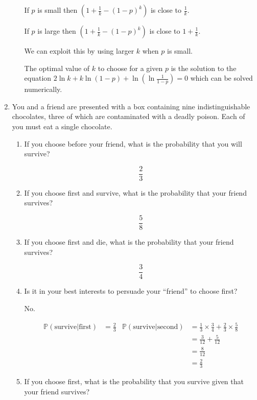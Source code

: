 \documentclass[10pt,\jkfside,a4paper]{article}
\begin{document}
\begin{enumerate}
\begin{enumerate}
If $p$ is small then $(1 + \frac{1}{k} - (1 - p)^k)$ is close to $\frac{1}{k}$.

If $p$ is large then $(1 + \frac{1}{k} - (1 - p)^k)$ is close to $1 + \frac{1}{k}$.

We can exploit this by using larger $k$ when $p$ is small.

The optimal value of $k$ to choose for a given $p$ is the solution to the equation
$2 \ln k + k\ln(1 - p) + \ln\left(\ln \frac{1}{1 - p}\right) = 0$ which can be solved
numerically.

\end{enumerate}

\item 

You and a friend are presented with a box containing nine
indistinguishable chocolates, three of which are contaminated with a deadly poison.
Each of you must eat a single chocolate.

\begin{enumerate}

\item
If you choose before your friend, what is the probability that you will survive?

\[
\frac{2}{3}
\]

\item 
If you choose first and survive, what is the probability that your friend survives?

\[
\frac{5}{8}
\]

\item 
If you choose first and die, what is the probability that your friend survives?

\[
\frac{3}{4}
\]

\item Is it in your best interests to persuade your ``friend'' to choose first?

No.

\begin{align*}
\mathbb{P}(\text{survive}|\text{first}) &= \frac{2}{3} & \mathbb{P}(\text{survive}|\text{second}) &=
\frac{1}{3}\times \frac{3}{4} + \frac{2}{3} \times \frac{5}{8} \\
& & &= \frac{3}{12} + \frac{5}{12} \\
& & &= \frac{8}{12} \\
& & &= \frac{2}{3}
\end{align*}

\item
If you choose first, what is the probability that you survive given that your
friend survives?


\end{enumerate}
\end{enumerate}
\end{document}

